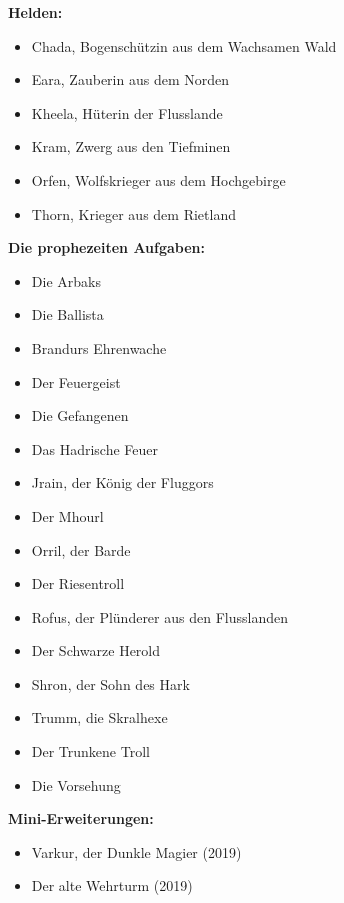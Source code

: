 \documentclass[10pt, a4paper, oneside]{book}
\begin{document}
\begin{multicols}{2}
\textbf{Helden:}


\begin{itemize}[topsep=0pt,itemsep=-1ex,partopsep=1ex,parsep=1ex]
    \item Chada, Bogenschützin aus dem Wachsamen Wald
    \item Eara, Zauberin aus dem Norden
    \item Kheela, Hüterin der Flusslande
    \item Kram, Zwerg aus den Tiefminen
    \item Orfen, Wolfskrieger aus dem Hochgebirge
    \item Thorn, Krieger aus dem Rietland
\end{itemize}


\textbf{Die prophezeiten Aufgaben:}


\begin{itemize}[topsep=0pt,itemsep=-1ex,partopsep=1ex,parsep=1ex]
    \item Die Arbaks
    \item Die Ballista
    \item Brandurs Ehrenwache
    \item Der Feuergeist
    \item Die Gefangenen
    \item Das Hadrische Feuer
    \item Jrain, der König der Fluggors
    \item Der Mhourl
    \item Orril, der Barde
    \item Der Riesentroll
    \item Rofus, der Plünderer aus den Flusslanden
    \item Der Schwarze Herold
    \item Shron, der Sohn des Hark
    \item Trumm, die Skralhexe
    \item Der Trunkene Troll
    \item Die Vorsehung
\end{itemize}



\textbf{Mini-Erweiterungen:}

\begin{itemize}[topsep=0pt,itemsep=-1ex,partopsep=1ex,parsep=1ex]
    \item Varkur, der Dunkle Magier (2019)
    \item Der alte Wehrturm (2019)
\end{itemize}


\end{multicols}
\end{document}
